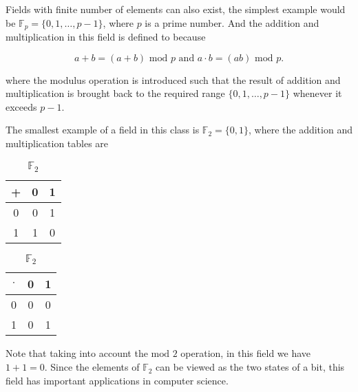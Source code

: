 \documentclass[a4paper,12pt]{report}
\begin{document}
\begin{appendices}
Fields with finite number of elements can also exist, the simplest example would be \(\mathbb{F}_{p} = \{0,1,\ldots ,p-1\} \), where \(p\) is a prime number. And the addition and multiplication in this field is defined to because

\begin{equation}
    a + b = (a+b) \text{ mod } p \text { and } a \cdot b = (ab) \text{ mod } p. 
\end{equation}

where the modulus operation is introduced such that the result of addition and multiplication is brought back to the required range \(\{0,1,\ldots ,p-1\}\) whenever it exceeds \(p-1\).

The smallest example of a field in this class is \(\mathbb{F} _{2}  = \{0,1\} \), where the addition and multiplication tables are


\begin{table}[H]
    \begin{minipage}[t]{0.5\linewidth}
    \centering
    \begin{tabular}{c|c|c}
        \toprule
          +   &  0  &  1 \\
        \midrule
          0   &  0  &  1 \\
          1   &  1  &  0 \\
        \bottomrule
    \end{tabular}
    \caption{ \(\mathbb{F}_{2}  \) }
\label{add}
\end{minipage} 
\begin{minipage}[t]{0.5\linewidth}
    \centering
    \begin{tabular}{c|c|c}
        \toprule
          \(\cdot \)    & 0 & 1  \\
        \midrule
            0 & 0 &  0 \\
            1 & 0 &  1 \\
        \bottomrule
    \end{tabular}
    \caption{ \(\mathbb{F}_{2}  \)  }
\label{mul}
\end{minipage}
\end{table}

Note that taking into account the \(\text{mod } 2 \) operation, in this field we have \(1+1 = 0\). Since the elements of \(\mathbb{F}_{2}  \) can be viewed as the two states of a bit, this field has important applications in computer science. 




\end{appendices}
\end{document}
